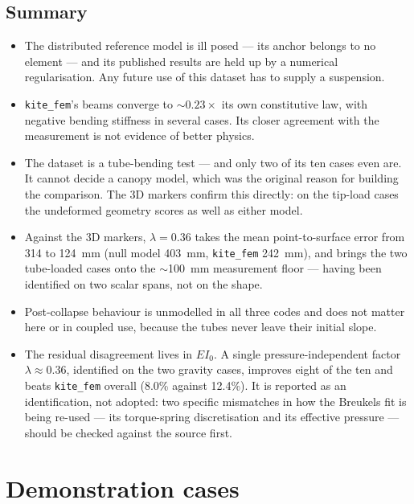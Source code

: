 \documentclass[11pt,a4paper]{article}
\begin{document}
\subsection{Summary}

\begin{itemize}
\item The distributed reference model is ill posed --- its anchor belongs to no
      element --- and its published results are held up by a numerical
      regularisation. Any future use of this dataset has to supply a suspension.
\item \texttt{kite\_fem}'s beams converge to $\sim0.23\times$ its own
      constitutive law, with negative bending stiffness in several cases. Its
      closer agreement with the measurement is not evidence of better physics.
\item The dataset is a tube-bending test --- and only two of its ten cases even
      are. It cannot decide a canopy model, which was the original reason for
      building the comparison. The 3D markers confirm this directly: on the
      tip-load cases the undeformed geometry scores as well as either model.
\item Against the 3D markers, $\lambda = 0.36$ takes the mean point-to-surface
      error from \SI{314}{} to \SI{124}{mm} (null model \SI{403}{mm},
      \texttt{kite\_fem} \SI{242}{mm}), and
      brings the two tube-loaded cases onto the $\sim$\SI{100}{mm} measurement
      floor --- having been identified on two scalar spans, not on the shape.
\item Post-collapse behaviour is unmodelled in all three codes and does not
      matter here or in coupled use, because the tubes never leave their initial
      slope.
\item The residual disagreement lives in $EI_0$. A single pressure-independent
      factor $\lambda \approx 0.36$, identified on the two gravity cases,
      improves eight of the ten and beats \texttt{kite\_fem} overall
      (8.0\% against 12.4\%). It is reported as an identification, not
      adopted: two specific mismatches in how the Breukels fit is being
      re-used --- its torque-spring discretisation and its effective
      pressure --- should be checked against the source first.
\end{itemize}


\section{Demonstration cases}
\end{document}
